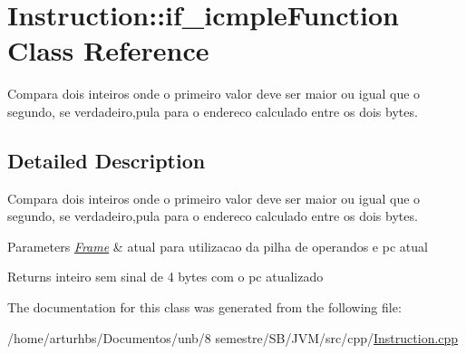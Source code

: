 \hypertarget{classInstruction_1_1if__icmpleFunction}{}\section{Instruction\+:\+:if\+\_\+icmple\+Function Class Reference}
\label{classInstruction_1_1if__icmpleFunction}


Compara dois inteiros onde o primeiro valor deve ser maior ou igual que o segundo, se verdadeiro,pula para o endereco calculado entre os dois bytes.  




\subsection{Detailed Description}
Compara dois inteiros onde o primeiro valor deve ser maior ou igual que o segundo, se verdadeiro,pula para o endereco calculado entre os dois bytes. 


\begin{DoxyParams}{Parameters}
{\em \hyperlink{classFrame}{Frame}} & atual para utilizacao da pilha de operandos e pc atual \\
\hline
\end{DoxyParams}
\begin{DoxyReturn}{Returns}
inteiro sem sinal de 4 bytes com o pc atualizado 
\end{DoxyReturn}


The documentation for this class was generated from the following file\+:\begin{DoxyCompactItemize}
\item 
/home/arturhbs/\+Documentos/unb/8 semestre/\+S\+B/\+J\+V\+M/src/cpp/\hyperlink{Instruction_8cpp}{Instruction.\+cpp}\end{DoxyCompactItemize}
